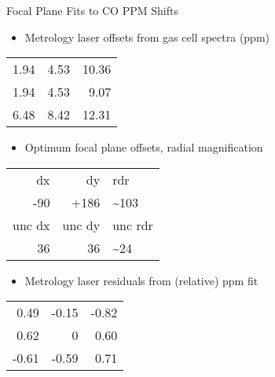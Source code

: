 \documentclass[10pt,t]{beamer}
\begin{document}
\begin{frame}[label={sec:org7fd0465}]{Focal Plane Fits to CO PPM Shifts}
\begin{small}

\begin{itemize}
\item Metrology laser offsets from gas cell spectra (ppm)
\end{itemize}
\begin{center}
\begin{tabular}{rrr}
1.94 & 4.53 & 10.36\\
1.94 & 4.53 & 9.07\\
6.48 & 8.42 & 12.31\\
\end{tabular}
\end{center}

\begin{itemize}
\item Optimum focal plane offsets, radial magnification
\end{itemize}
\begin{center}
\begin{tabular}{rrl}
dx & dy & rdr\\
-90 & +186 & \textasciitilde{}103\\
\hline
unc   dx & unc   dy & unc rdr\\
36 & 36 & \textasciitilde{}24\\
\end{tabular}
\end{center}

\begin{itemize}
\item Metrology laser residuals from (relative) ppm fit
\end{itemize}
\begin{center}
\begin{tabular}{rrr}
0.49 & -0.15 & -0.82\\
0.62 & 0 & 0.60\\
-0.61 & -0.59 & 0.71\\
\end{tabular}
\end{center}
\end{small}
\end{frame}
\end{document}
